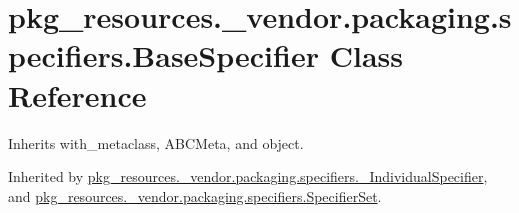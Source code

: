 \hypertarget{classpkg__resources_1_1__vendor_1_1packaging_1_1specifiers_1_1_base_specifier}{}\section{pkg\+\_\+resources.\+\_\+vendor.\+packaging.\+specifiers.\+Base\+Specifier Class Reference}
\label{classpkg__resources_1_1__vendor_1_1packaging_1_1specifiers_1_1_base_specifier}


Inherits with\+\_\+metaclass, A\+B\+C\+Meta, and object.



Inherited by \hyperlink{classpkg__resources_1_1__vendor_1_1packaging_1_1specifiers_1_1___individual_specifier}{pkg\+\_\+resources.\+\_\+vendor.\+packaging.\+specifiers.\+\_\+\+Individual\+Specifier}, and \hyperlink{classpkg__resources_1_1__vendor_1_1packaging_1_1specifiers_1_1_specifier_set}{pkg\+\_\+resources.\+\_\+vendor.\+packaging.\+specifiers.\+Specifier\+Set}.

